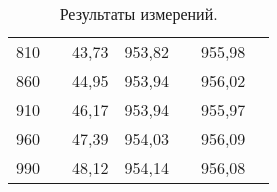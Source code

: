 \documentclass[a4paper,12pt]{report}
\begin{document}
\begin{table}[H]
\begin{tabular}{|c|c|c|c|c|c|c|}
810    &                      & 43,73 & 953,82 &                        & 955,98  &                        \\ \cline{1-1} \cline{3-4} \cline{6-6}
860    &                      & 44,95 & 953,94 &                        & 956,02  &                        \\ \cline{1-1} \cline{3-4} \cline{6-6}
910    &                      & 46,17 & 953,94 &                        & 955,97  &                        \\ \cline{1-1} \cline{3-4} \cline{6-6}
960    &                      & 47,39 & 954,03 &                        & 956,09  &                        \\ \cline{1-1} \cline{3-4} \cline{6-6}
990    &                      & 48,12 & 954,14 &                        & 956,08  &                        \\ \hline
\end{tabular}
\caption{Результаты измерений.}
\end{table} 
\end{document}
